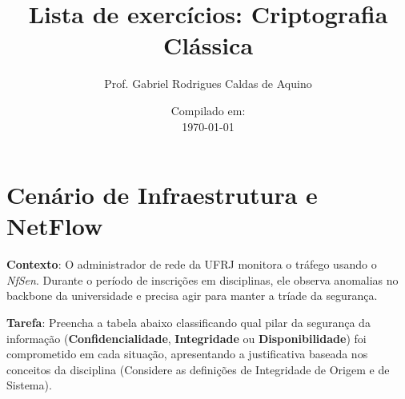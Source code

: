 \title{Lista de exercícios: Criptografia Clássica}
\author{Prof. Gabriel Rodrigues Caldas de Aquino}
\date{Compilado em: \\ \today}





\section{Cenário de Infraestrutura e NetFlow}

\textbf{Contexto}:
O administrador de rede da UFRJ monitora o tráfego usando o \textit{NfSen}. Durante o período de inscrições em disciplinas, ele observa anomalias no backbone da universidade e precisa agir para manter a tríade da segurança.

\textbf{Tarefa}:
Preencha a tabela abaixo classificando qual pilar da segurança da informação (\textbf{Confidencialidade}, \textbf{Integridade} ou \textbf{Disponibilidade}) foi comprometido em cada situação, apresentando a justificativa baseada nos conceitos da disciplina (Considere as definições de Integridade de Origem e de Sistema).


